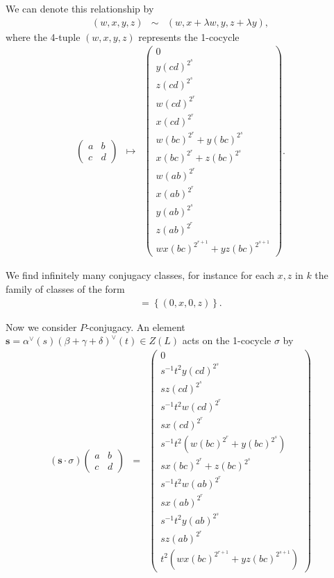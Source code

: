We can denote this relationship by
\begin{eqnarray*}
(w,x,y,z) &\sim& (w, x+\lambda w, y, z + \lambda y),
\end{eqnarray*}
where the 4-tuple $(w,x,y,z)$ represents the 1-cocycle 
\begin{eqnarray*}
\left(\begin{matrix} a & b \\ c & d \end{matrix}\right) &\mapsto&
\left(\begin{matrix}
0 \\
y(cd)^{2^s} \\
z(cd)^{2^s} \\
w(cd)^{2^r} \\
x(cd)^{2^r} \\
w(bc)^{2^r} + y(bc)^{2^s} \\
x(bc)^{2^r} + z(bc)^{2^s} \\
w(ab)^{2^r} \\
x(ab)^{2^r}  \\
y(ab)^{2^s} \\
z(ab)^{2^r} \\
wx(bc)^{2^{r+1}} + yz(bc)^{2^{s+1}}
\end{matrix}\right).
\end{eqnarray*}

We find infinitely many conjugacy classes, for instance for each $x, z$ in $k$ the family of classes of the form
\begin{eqnarray*}
[(0,x,0,z)] = \left\{(0,x,0,z)\right\}.
\end{eqnarray*}

Now we consider $P$-conjugacy. An element $\mathbf{s} = \alpha^\vee(s)(\beta + \gamma + \delta)^\vee(t)\in Z(L)$ acts on the 1-cocycle $\sigma$ by
\begin{eqnarray*}
(\mathbf{s}\cdot\sigma)\left(\begin{matrix} a & b \\ c & d\end{matrix}\right)
&=&
\left(\begin{matrix}
0 \\
s^{-1}t^{2}y(cd)^{2^s} \\
sz(cd)^{2^s} \\
s^{-1}t^{2}w(cd)^{2^r} \\
sx(cd)^{2^r} \\
s^{-1}t^{2}(w(bc)^{2^r} + y(bc)^{2^s}) \\
sx(bc)^{2^r} + z(bc)^{2^s} \\
s^{-1}t^{2}w(ab)^{2^r} \\
sx(ab)^{2^r}  \\
s^{-1}t^{2}y(ab)^{2^s} \\
sz(ab)^{2^r} \\
t^2(wx(bc)^{2^{r+1}} + yz(bc)^{2^{s+1}})
\end{matrix}\right)
\end{eqnarray*}






